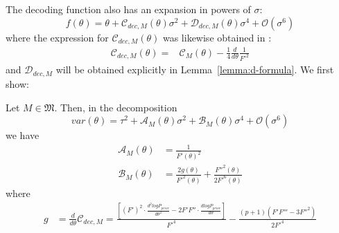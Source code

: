 The decoding function also has an expansion in powers of $\sigma$:
\begin{equation}\label{eq:expansion-f}
f(\theta) = \theta + \mathcal{C}_{dec,M}(\theta) \sigma^2 + \mathcal{D}_{dec,M}(\theta) \sigma^4 + \mathcal{O}(\sigma^6)    
\end{equation}
where the expression for $\mathcal{C}_{dec,M}(\theta)$ was likewise obtained in \cite{hahn2024unifying}:
\begin{align*}
    \mathcal{C}_{dec,M}(\theta)  =  & \mathcal{C}_{M}(\theta) - \frac{1}{4} \frac{d}{d\theta} \frac{1}{F'^2} 
\end{align*}
and $\mathcal{D}_{dec,M}$ will be obtained explicitly in Lemma~\ref{lemma:d-formula}.
We first show:
\begin{lemma}\label{lemma:calculation-for-b}
Let $M \in \mathfrak{M}$. Then, in the decomposition
\begin{equation}
var(\theta) = \tau^2 + \mathcal{A}_M(\theta) \sigma^2 + \mathcal{B}_M(\theta) \sigma^4 + \mathcal{O}(\sigma^6) 
\end{equation}
we have
\begin{align*}
    \mathcal{A}_M(\theta) &= \frac{1}{F'(\theta)^2} \\
        \mathcal{B}_M(\theta) &= \frac{2g(\theta)}{F'^2(\theta)} + \frac{F''^2(\theta)}{2F'^6(\theta)}
        \end{align*}
        where
        \begin{align*}
        g &= \frac{d}{d\theta} \mathcal{C}_{dec,M} = \frac{[(F')^2 \cdot \frac{d^2 logP_{prior}}{d \theta^2} - 2F'F'' \cdot \frac{d logP_{prior}}{d \theta}]}{F'^4} - \frac{(p+1)(F'F''' - 3F''^2)}{2F'^4}
\end{align*}

\end{lemma}

